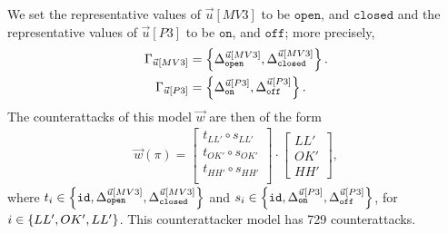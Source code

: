 {{We set the representative values of $\vec{u}[MV3]$ to be $\texttt{open}$, and $\texttt{closed}$ and the representative values of $\vec{u}[P3]$ to be $\texttt{on}$, and $\texttt{off}$; more precisely, 
\begin{align*}
  \Gamma_{\vec{u}[MV3]}&=\left\{{\Delta}^{\vec{u}[MV3]}_{\texttt{open}}, {\Delta}^{\vec{u}[MV3]}_{\texttt{closed}}\right\}.\\
  \Gamma_{\vec{u}[P3]}&=\left\{{\Delta}^{\vec{u}[P3]}_{\texttt{on}}, {\Delta}^{\vec{u}[P3]}_{\texttt{off}}\right\}.
\end{align*}
The counterattacks of this model $\vec{w}$ are then of the form
\begin{align*}
  \vec{w}(\pi)=
  \begin{bmatrix}
    t_{LL'}\circ s_{LL'} \\
    t_{OK'}\circ s_{OK'} \\
    t_{HH'}\circ s_{HH'} \\
  \end{bmatrix}
  \cdot
  \begin{bmatrix}
    LL' \\
    OK' \\
    HH'
  \end{bmatrix},
\end{align*} 
where $t_i\in \left\{{\texttt{id}},{\Delta}^{\vec{u}[MV3]}_{\texttt{open}}, {\Delta}^{\vec{u}[MV3]}_{\texttt{closed}}\right\}$ and  $s_i\in\left\{{\texttt{id}},{\Delta}^{\vec{u}[P3]}_{\texttt{on}}, {\Delta}^{\vec{u}[P3]}_{\texttt{off}}\right\}$, for $i\in \left\{LL',OK',LL'\right\}$. This counterattacker model has 729 counterattacks.



}}
